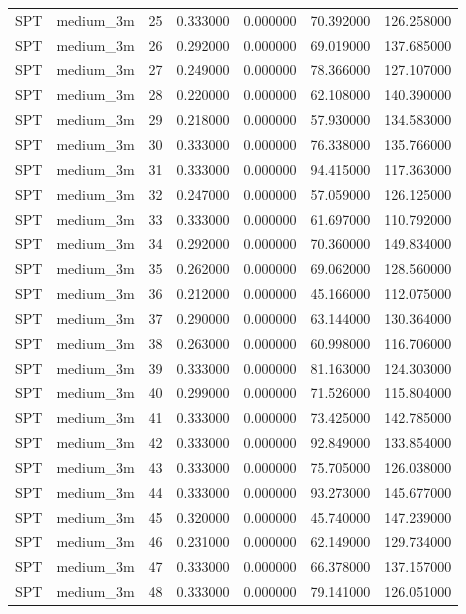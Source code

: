 \begin{tabular}{llrrrrr}
SPT & medium_3m & 25 & 0.333000 & 0.000000 & 70.392000 & 126.258000 \\
SPT & medium_3m & 26 & 0.292000 & 0.000000 & 69.019000 & 137.685000 \\
SPT & medium_3m & 27 & 0.249000 & 0.000000 & 78.366000 & 127.107000 \\
SPT & medium_3m & 28 & 0.220000 & 0.000000 & 62.108000 & 140.390000 \\
SPT & medium_3m & 29 & 0.218000 & 0.000000 & 57.930000 & 134.583000 \\
SPT & medium_3m & 30 & 0.333000 & 0.000000 & 76.338000 & 135.766000 \\
SPT & medium_3m & 31 & 0.333000 & 0.000000 & 94.415000 & 117.363000 \\
SPT & medium_3m & 32 & 0.247000 & 0.000000 & 57.059000 & 126.125000 \\
SPT & medium_3m & 33 & 0.333000 & 0.000000 & 61.697000 & 110.792000 \\
SPT & medium_3m & 34 & 0.292000 & 0.000000 & 70.360000 & 149.834000 \\
SPT & medium_3m & 35 & 0.262000 & 0.000000 & 69.062000 & 128.560000 \\
SPT & medium_3m & 36 & 0.212000 & 0.000000 & 45.166000 & 112.075000 \\
SPT & medium_3m & 37 & 0.290000 & 0.000000 & 63.144000 & 130.364000 \\
SPT & medium_3m & 38 & 0.263000 & 0.000000 & 60.998000 & 116.706000 \\
SPT & medium_3m & 39 & 0.333000 & 0.000000 & 81.163000 & 124.303000 \\
SPT & medium_3m & 40 & 0.299000 & 0.000000 & 71.526000 & 115.804000 \\
SPT & medium_3m & 41 & 0.333000 & 0.000000 & 73.425000 & 142.785000 \\
SPT & medium_3m & 42 & 0.333000 & 0.000000 & 92.849000 & 133.854000 \\
SPT & medium_3m & 43 & 0.333000 & 0.000000 & 75.705000 & 126.038000 \\
SPT & medium_3m & 44 & 0.333000 & 0.000000 & 93.273000 & 145.677000 \\
SPT & medium_3m & 45 & 0.320000 & 0.000000 & 45.740000 & 147.239000 \\
SPT & medium_3m & 46 & 0.231000 & 0.000000 & 62.149000 & 129.734000 \\
SPT & medium_3m & 47 & 0.333000 & 0.000000 & 66.378000 & 137.157000 \\
SPT & medium_3m & 48 & 0.333000 & 0.000000 & 79.141000 & 126.051000 \\

\end{tabular}
